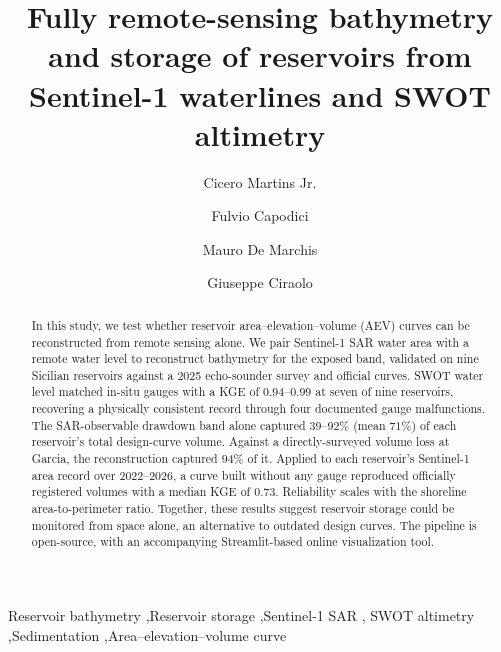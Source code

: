 \documentclass[review,12pt,authoryear]{elsarticle}
\begin{document}
\begin{frontmatter}

\title{Fully remote-sensing bathymetry and storage of reservoirs from
       Sentinel-1 waterlines and SWOT altimetry}

\author[unipa]{Cicero Martins Jr.}
\author[unipa]{Fulvio Capodici}
\author[unipa]{Mauro De Marchis}
\author[unipa]{Giuseppe Ciraolo}

\begin{abstract}
In this study, we test whether reservoir area--elevation--volume (AEV) curves can be
reconstructed from remote sensing alone. We pair Sentinel-1 SAR water area with a
remote water level to reconstruct bathymetry for the exposed band, validated on nine
Sicilian reservoirs against a 2025 echo-sounder survey and official curves. SWOT water
level matched in-situ gauges with a KGE of $0.94$--$0.99$ at seven of nine reservoirs,
recovering a physically consistent record through four documented gauge malfunctions.
The SAR-observable drawdown band alone captured $39$--$92\%$ (mean $71\%$) of each
reservoir's total design-curve volume. Against a directly-surveyed volume loss at
Garcia, the reconstruction captured $94\%$ of it. Applied to each reservoir's Sentinel-1
area record over 2022--2026, a curve built without any gauge reproduced officially
registered volumes with a median KGE of $0.73$. Reliability scales with the shoreline
area-to-perimeter ratio. Together, these results suggest reservoir storage could be
monitored from space alone, an alternative to outdated design curves. The pipeline is open-source, with an accompanying Streamlit-based
online visualization tool.
\end{abstract}

\begin{keyword}
Reservoir bathymetry \sep Reservoir storage \sep Sentinel-1 SAR \sep
SWOT altimetry \sep Sedimentation \sep Area--elevation--volume curve
\end{keyword}

\end{frontmatter}

\linenumbers
\end{document}
